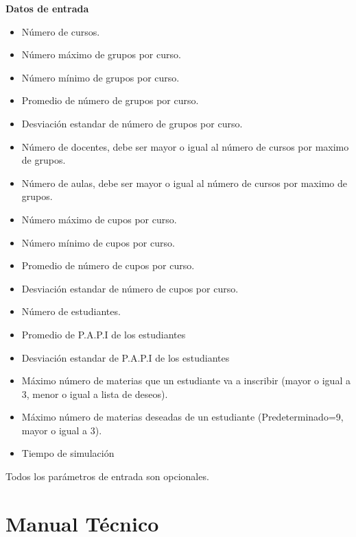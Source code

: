 \documentclass{article}
\begin{document}
\textbf{Datos de entrada}

\begin{itemize}
  \item Número de cursos.
  \item Número máximo de grupos por curso.
  \item Número mínimo de grupos por curso.
  \item Promedio de número de grupos por curso.
  \item Desviación estandar de número de grupos por curso.
  \item Número de docentes, debe ser mayor o igual al número de cursos por maximo de grupos.
  \item Número de aulas, debe ser mayor o igual al número de cursos por maximo de grupos.
  \item Número máximo de cupos por curso.
  \item Número mínimo de cupos por curso.
  \item Promedio de número de cupos por curso.
  \item Desviación estandar de número de cupos por curso.
  \item Número de estudiantes.
  \item Promedio de P.A.P.I de los estudiantes
  \item Desviación estandar de P.A.P.I de los estudiantes
  \item Máximo número de materias que un estudiante va a inscribir (mayor o igual a 3, 
        menor o igual a lista de deseos).
  \item Máximo número de materias deseadas de un estudiante (Predeterminado=9, mayor o igual a 3).
  \item Tiempo de simulación
\end{itemize}

Todos los parámetros de entrada son opcionales.



\section{Manual Técnico}\label{sec:man_t}


\end{document}

